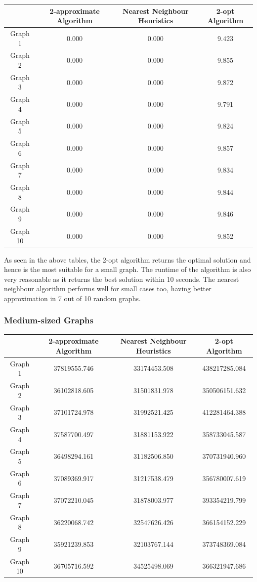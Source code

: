 \documentclass[paper=a4, fontsize=11pt]{scrartcl}	%
\numberwithin{equation}{section}		%
\numberwithin{figure}{section}			%
\numberwithin{table}{section}				%
\begin{document}
\begin{center}

\begin{tabular}{|c|c|c|c|}
\hline 
 & 2-approximate Algorithm & Nearest Neighbour Heuristics & 2-opt Algorithm \\ 
\hline 
Graph 1 & 0.000 & 0.000 & 9.423 \\ 
\hline 
Graph 2 & 0.000 & 0.000 & 9.855 \\ 
\hline 
Graph 3 & 0.000 & 0.000 & 9.872 \\ 
\hline 
Graph 4 & 0.000 & 0.000 & 9.791 \\ 
\hline 
Graph 5 & 0.000 & 0.000 & 9.824 \\ 
\hline 
Graph 6 & 0.000 & 0.000 & 9.857\\ 
\hline 
Graph 7 & 0.000 & 0.000 & 9.834 \\ 
\hline 
Graph 8 & 0.000 & 0.000 & 9.844 \\ 
\hline 
Graph 9 & 0.000 & 0.000 & 9.846 \\ 
\hline 
Graph 10 & 0.000 & 0.000 & 9.852 \\ 
\hline 
\end{tabular} 
\end{center}

As seen in the above tables, the 2-opt algorithm returns the optimal solution and hence is the most suitable for a small graph. The runtime of the algorithm is also very reasonable as it returns the best solution within 10 seconds. The nearest neighbour algorithm performs well for small cases too, having better approximation in 7 out of 10 random graphs.

\subsubsection{Medium-sized Graphs}
\begin{center}

\begin{tabular}{|c|c|c|c|}
\hline 
 & 2-approximate Algorithm & Nearest Neighbour Heuristics & 2-opt Algorithm \\ 
\hline 
Graph 1  & 37819555.746 & 33174453.508 & 438217285.084 \\ 
\hline 
Graph 2 & 36102818.605 & 31501831.978 & 350506151.632 \\ 
\hline 
Graph 3 & 37101724.978 & 31992521.425 & 412281464.388 \\ 
\hline 
Graph 4 & 37587700.497 & 31881153.922 & 358733045.587 \\ 
\hline 
Graph 5 & 36498294.161 & 31182506.850 & 370731940.960 \\ 
\hline 
Graph 6 & 37089369.917 & 31217538.479 & 356780007.619\\ 
\hline 
Graph 7 & 37072210.045 & 31878003.977 & 393354219.799 \\ 
\hline 
Graph 8 & 36220068.742 & 32547626.426 & 366154152.229\\ 
\hline 
Graph 9 &  35921239.853 & 32103767.144 & 373748369.084 \\ 
\hline 
Graph 10 & 36705716.592 & 34525498.069& 366321947.686 \\ 
\hline 
\end{tabular} 
\end{center}
\end{document}
